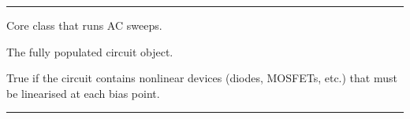 \documentclass[letterpaper,10pt,english]{sphinxmanual}
\begin{document}
\bigskip\hrule\bigskip


\begin{fulllineitems}
\label{\detokenize{ac_engine:ACEngine}}
\pysigstartsignatures
\pysiglinewithargsret
{}
{\sphinxparamcomma {}}
{}
\pysigstopsignatures
\sphinxAtStartPar
Core class that runs AC sweeps.

\begin{fulllineitems}
\label{\detokenize{ac_engine:ACEngine.circuit}}
\pysigstartsignatures
\pysigline
{}
\pysigstopsignatures
\sphinxAtStartPar
{} \textendash{} The fully populated circuit object.

\end{fulllineitems}


\begin{fulllineitems}
\label{\detokenize{ac_engine:ACEngine.is_nonlinear}}
\pysigstartsignatures
\pysigline
{}
\pysigstopsignatures
\sphinxAtStartPar
{} \textendash{} True if the circuit contains nonlinear devices (diodes,
MOSFETs, etc.) that must be linearised at each bias point.

\end{fulllineitems}


\end{fulllineitems}



\bigskip\hrule\bigskip

\end{document}
